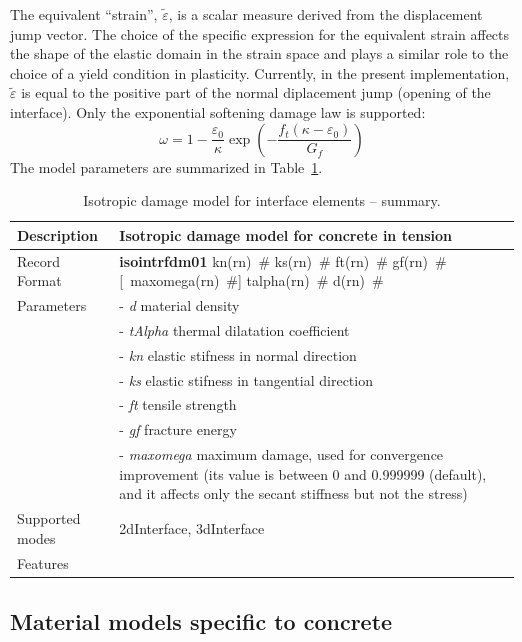 \documentclass[a4paper]{article}
\newcommand{\descitem}[1]{{\noindent \bf #1}}
\newcommand{\elemparam}[2]{{{#1\tiny (#2)}~\#}}
\newcommand{\optelemparam}[2]{[{~\elemparam{#1}{#2}}]}
\newcommand{\param}[1]{{\it #1}}
\begin{document}
The equivalent ``strain'', $\tilde\varepsilon$, is a scalar measure derived from the displacement jump vector. The choice of the specific expression
for the equivalent strain affects the shape of the elastic domain
in the strain space and plays a similar role to the choice of a yield
condition in plasticity.
Currently, in the present implementation,  $\tilde\varepsilon$ is equal to the positive part of the normal diplacement jump (opening of the interface).
Only the exponential softening damage law is supported:
$$
\omega = 1 - \frac{\varepsilon_0}{\kappa}  \exp\left( - \frac{f_t( \kappa - \varepsilon_0 )}{G_f} \right)
$$
The model parameters are summarized in Table~\ref{iid_table}. 
\begin{table}[!htb]
  \small
\begin{tabular}{|l|p{9cm}|}
\hline
Description & Isotropic damage model for concrete in tension\\
\hline
Record Format & \descitem{isointrfdm01} 
\elemparam{kn}{rn} \elemparam{ks}{rn} \elemparam{ft}{rn} \elemparam{gf}{rn} \optelemparam{maxomega}{rn} \elemparam{talpha}{rn} \elemparam{d}{rn}\\
Parameters & - \param{d} material density\\
&- \param{tAlpha} thermal dilatation coefficient\\
&- \param{kn} elastic stifness in normal direction\\
&- \param{ks} elastic stifness in tangential direction\\
&- \param{ft} tensile strength\\
&- \param{gf} fracture energy\\
&- \param{maxomega} maximum damage, used for convergence improvement
(its value is between 0 and 0.999999 (default), 
and it affects only the secant stiffness but not the stress)\\
Supported modes& 2dInterface, 3dInterface\\
Features & \\
\hline
\end{tabular}
\caption{Isotropic damage model for interface elements -- summary.}
\label{iid_table}
\end{table}


\subsection{Material models specific to concrete}
\end{document}
